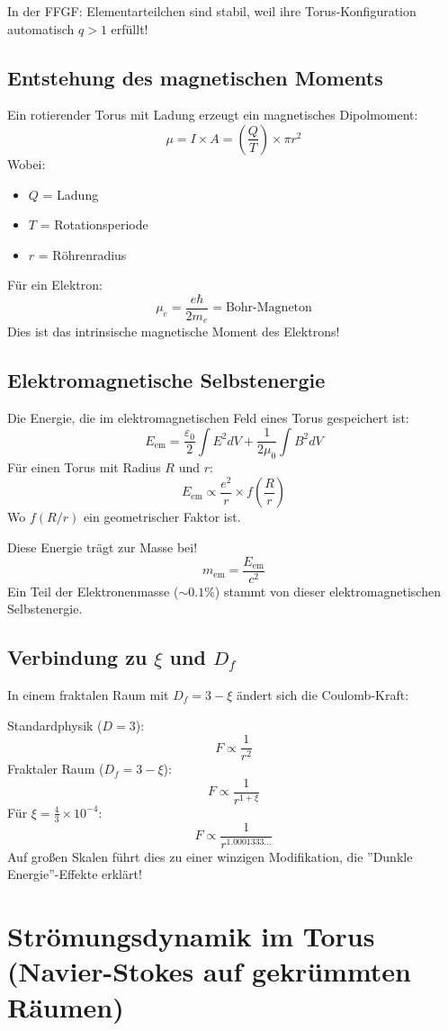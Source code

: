\documentclass[12pt,a4paper]{article}
\begin{document}
	In der FFGF: Elementarteilchen sind stabil, weil ihre Torus-Konfiguration automatisch \( q > 1 \) erfüllt!
	
	\subsection{Entstehung des magnetischen Moments}
	Ein rotierender Torus mit Ladung erzeugt ein magnetisches Dipolmoment:
	\[
	\mu = I \times A = \left(\frac{Q}{T}\right) \times \pi r^2
	\]
	Wobei:
	\begin{itemize}
		\item \( Q \) = Ladung
		\item \( T \) = Rotationsperiode
		\item \( r \) = Röhrenradius
	\end{itemize}
	
	Für ein Elektron:
	\[
	\mu_e = \frac{e \hbar}{2 m_e} = \text{Bohr-Magneton}
	\]
	Dies ist das intrinsische magnetische Moment des Elektrons!
	
	\subsection{Elektromagnetische Selbstenergie}
	Die Energie, die im elektromagnetischen Feld eines Torus gespeichert ist:
	\[
	E_{\text{em}} = \frac{\varepsilon_0}{2} \int E^2 dV + \frac{1}{2\mu_0} \int B^2 dV
	\]
	Für einen Torus mit Radius \( R \) und \( r \):
	\[
	E_{\text{em}} \propto \frac{e^2}{r} \times f\left(\frac{R}{r}\right)
	\]
	Wo \( f(R/r) \) ein geometrischer Faktor ist.
	
	Diese Energie trägt zur Masse bei!
	\[
	m_{\text{em}} = \frac{E_{\text{em}}}{c^2}
	\]
	Ein Teil der Elektronenmasse (\( \sim 0.1\% \)) stammt von dieser elektromagnetischen Selbstenergie.
	
	\subsection{Verbindung zu \( \xi \) und \( D_f \)}
	In einem fraktalen Raum mit \( D_f = 3 - \xi \) ändert sich die Coulomb-Kraft:
	
	Standardphysik (\( D = 3 \)):
	\[
	F \propto \frac{1}{r^2}
	\]
	Fraktaler Raum (\( D_f = 3 - \xi \)):
	\[
	F \propto \frac{1}{r^{1 + \xi}}
	\]
	Für \( \xi = \frac{4}{3} \times 10^{-4} \):
	\[
	F \propto \frac{1}{r^{1.0001333\ldots}}
	\]
	Auf großen Skalen führt dies zu einer winzigen Modifikation, die ''Dunkle Energie''-Effekte erklärt!
	
	\section{Strömungsdynamik im Torus (Navier-Stokes auf gekrümmten Räumen)}
\end{document}

